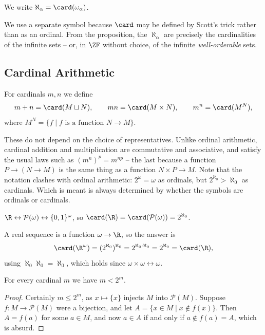 \begin{definition}[Aleph]
  We write $\aleph_\alpha = \card(\omega_\alpha)$.
\end{definition}

We use a separate symbol because $\card$ may be defined by Scott's trick rather than as an ordinal. From the proposition, the $\aleph_\alpha$ are precisely the cardinalities of the infinite sets -- or, in $\ZF$ without choice, of the infinite \emph{well-orderable} sets.

\subsection{Cardinal Arithmetic}

\begin{definition}
  For cardinals $m, n$ we define
  $$m + n = \card(M \sqcup N), \qquad mn = \card(M \times N), \qquad m^n = \card(M^N),$$
  where $M^N = \{f \mid f \text{ is a function } N \to M\}$.
\end{definition}

These do not depend on the choice of representatives. Unlike ordinal arithmetic, cardinal addition and multiplication are commutative and associative, and satisfy the usual laws such as $(m^n)^p = m^{np}$ -- the last because a function $P \to (N \to M)$ is the same thing as a function $N \times P \to M$. Note that the notation clashes with ordinal arithmetic: $2^\omega = \omega$ as ordinals, but $2^{\aleph_0} > \aleph_0$ as cardinals. Which is meant is always determined by whether the symbols are ordinals or cardinals.

\begin{example}
  $\R \leftrightarrow \mathcal{P}(\omega) \leftrightarrow \{0,1\}^\omega$, so $\card(\R) = \card(\mathcal{P}(\omega)) = 2^{\aleph_0}$.
\end{example}

\begin{example}
  A real sequence is a function $\omega \to \R$, so the answer is
  $$\card(\R^\omega) = (2^{\aleph_0})^{\aleph_0} = 2^{\aleph_0 \cdot \aleph_0} = 2^{\aleph_0} = \card(\R),$$
  using $\aleph_0 \aleph_0 = \aleph_0$, which holds since $\omega \times \omega \leftrightarrow \omega$.
\end{example}

\begin{theorem}[Cantor]
  For every cardinal $m$ we have $m < 2^m$.
\end{theorem}
\begin{proof}
  Certainly $m \leq 2^m$, as $x \mapsto \{x\}$ injects $M$ into $\mathcal{P}(M)$. Suppose $f: M \to \mathcal{P}(M)$ were a bijection, and let $A = \{x \in M \mid x \notin f(x)\}$. Then $A = f(a)$ for some $a \in M$, and now $a \in A$ if and only if $a \notin f(a) = A$, which is absurd.
\end{proof}

